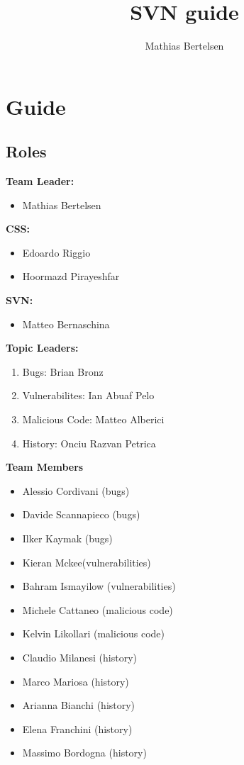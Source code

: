 \documentclass{article}
\author{Mathias Bertelsen}
\title{SVN guide}
\begin{document}
\maketitle

\tableofcontents
\newpage

\section{Guide}

\subsection{Roles}
\label{subsec:roles}

\textbf{Team Leader:}
\begin{itemize}
	\item Mathias Bertelsen
\end{itemize} \medskip

\noindent \textbf{CSS:}
\begin{itemize}
	\item Edoardo Riggio
	\item Hoormazd Pirayeshfar
\end{itemize} \medskip

\noindent \textbf{SVN:}
\begin{itemize}
	\item Matteo Bernaschina
\end{itemize} \medskip

\noindent \textbf{Topic Leaders:}
\begin{enumerate}
	\item Bugs: Brian Bronz
	\item Vulnerabilites: Ian Abuaf Pelo
	\item Malicious Code: Matteo Alberici
	\item History: Onciu Razvan Petrica
\end{enumerate} \medskip


\noindent \textbf{Team Members}
\begin{multicols}{2}
\begin{itemize}
\item Alessio Cordivani (bugs)
\item Davide Scannapieco (bugs)
\item Ilker Kaymak (bugs)
\item Kieran Mckee(vulnerabilities)
\item Bahram Ismayilow (vulnerabilities)
\item Michele Cattaneo (malicious code)
\item Kelvin Likollari (malicious code)
\item Claudio Milanesi (history)
\item Marco Mariosa (history)
\item Arianna Bianchi (history)
\item Elena Franchini (history)
\item Massimo Bordogna (history)
\end{itemize} \medskip
\end{multicols}
\end{document}
